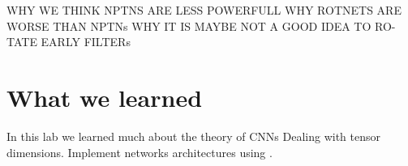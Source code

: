 \documentclass{llncs}
\begin{document}
WHY WE THINK NPTNS ARE LESS POWERFULL WHY ROTNETS ARE
WORSE THAN NPTNs WHY IT IS MAYBE NOT A GOOD IDEA TO RO-
TATE EARLY FILTERs

\section{What we learned}
In this lab we learned much about the theory of CNNs 
Dealing with tensor dimensions.
Implement networks architectures using \pytorch.


\printbibliography
\end{document}
